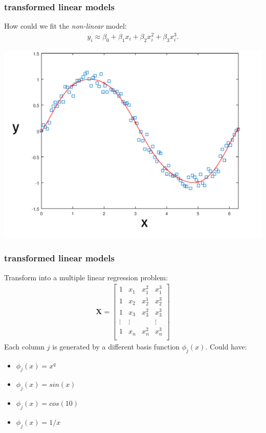 \documentclass[handout,compress]{beamer}
\begin{document}
\begin{frame}
	\frametitle{transformed linear models}
	How could we fit the \emph{non-linear} model:
	\begin{align*}
	y_i \approx \beta_0 + \beta_1 x_i +  \beta_2 x_i^2 +  \beta_3 x_i^3.
	\end{align*}
	\begin{center}
		\includegraphics[width=.6\textwidth]{poly_fit.png}
	\end{center}
\end{frame}

\begin{frame}
	\frametitle{transformed linear models}
	Transform into a multiple linear regression problem:
	\begin{align*}
	\textbf{X} = \begin{bmatrix}
	1 & x_1  &  x_1^2 & x_1^3\\
	1 & x_2  &  x_2^1 &  x_2^3 \\
	1 & x_3  &  x_3^2 &  x_3^3\\
	\vdots & \vdots  &  &\vdots\\
	1 & x_n  &  x_n^2 & x_n^3\\ 
	\end{bmatrix}
	\end{align*}
	Each column $j$ is generated by a different basis function $\phi_j(x)$. Could have:
	\begin{itemize}
		\item $\phi_j(x) = x^q$
		\item $\phi_j(x) = sin(x)$
		\item $\phi_j(x) = cos(10)$
		\item $\phi_j(x) = 1/x$
	\end{itemize}
\end{frame}
\end{document}
